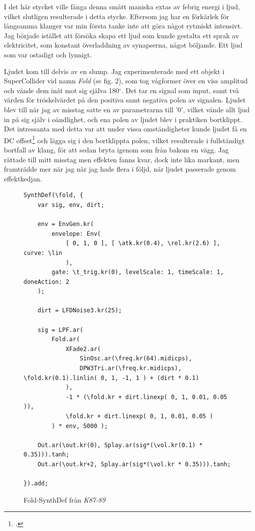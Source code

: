 \documentclass{article}
\renewcommand{\baselinestretch}{1.5}
\begin{document}
I det här stycket ville fånga denna smått maniska extas av febrig energi i ljud, vilket slutligen resulterade
i detta stycke. Eftersom jag har en förkärlek för långsamma klanger var min första tanke inte att göra något
rytmiskt intensivt. Jag började istället att försöka skapa ett ljud som kunde gestalta ett sprak av
elektricitet, som konstant överladdning av synapserna, något böljande. Ett ljud som var ostadigt och lynnigt.

Ljudet kom till delvis av en slump. Jag experimenterade med ett objekt i SuperCollider vid namn \emph{Fold}
(se fig. 2), som
tog vågformer över en viss amplitud och vände dem inåt mot sig själva 180$^{\circ}$. Det tar en signal som
input, samt två värden för tröskelvärdet på den positiva samt negativa polen av signalen. Ljudet blev till när
jag av misstag satte en av parametrarna till '0', vilket vände allt ljud in på sig själv i oändlighet, och ena
polen av ljudet blev i praktiken bortklippt. Det intressanta med detta var att under vissa omständigheter
kunde ljudet få en DC offset\footcite{dc} och lägga sig i den
bortklippta polen, vilket resulterade i fullständigt bortfall av klang, för att sedan bryta igenom som från
bakom en vägg. Jag rättade till mitt misstag men effekten fanns kvar, dock inte lika markant, men framträdde mer
när jag när jag hade flera i följd, när ljudet passerade genom effektkedjan.

\pagebreak
\begin{figure}
\renewcommand{\baselinestretch}{1}
\begin{lstlisting}[style=SuperCollider-IDE]
SynthDef(\fold, {
	var sig, env, dirt;

	env = EnvGen.kr(
		envelope: Env(
			[ 0, 1, 0 ], [ \atk.kr(0.4), \rel.kr(2.6) ], curve: \lin
			), 
		gate: \t_trig.kr(0), levelScale: 1, timeScale: 1, doneAction: 2
	);

	dirt = LFDNoise3.kr(25);

	sig = LPF.ar( 
		Fold.ar(
			XFade2.ar(
				SinOsc.ar(\freq.kr(64).midicps), 
				DPW3Tri.ar(\freq.kr.midicps), \fold.kr(0.1).linlin( 0, 1, -1, 1 ) + (dirt * 0.1)
			),
			-1 * (\fold.kr + dirt.linexp( 0, 1, 0.01, 0.05 )),
			\fold.kr + dirt.linexp( 0, 1, 0.01, 0.05 )
		) * env, 5000 );

	Out.ar(\out.kr(0), Splay.ar(sig*(\vol.kr(0.1) * 0.35))).tanh;
	Out.ar(\out.kr+2, Splay.ar(sig*(\vol.kr * 0.35))).tanh;

}).add;
\end{lstlisting}
\caption{Fold-SynthDef från \emph{K87-89}}
\end{figure}
\renewcommand{\baselinestretch}{1.5}
\end{document}

